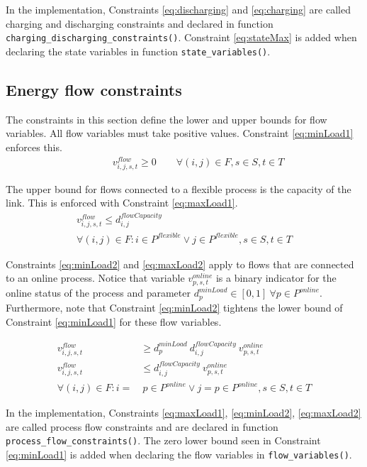 \documentclass{article}
\begin{document}
In the implementation, Constraints \eqref{eq:discharging} and \eqref{eq:charging} are called charging and discharging constraints and declared in function \texttt{charging\_discharging\_constraints()}. Constraint \eqref{eq:stateMax} is added when declaring the state variables in function \texttt{state\_variables()}.


\subsection{Energy flow constraints}

The constraints in this section define the lower and upper bounds for flow variables. All flow variables must take positive values. Constraint \eqref{eq:minLoad1} enforces this.
\begin{align}
    & \quad \quad v^{flow}_{i,j,s,t} \geq 0 \quad \quad \forall (i,j) \in F, s \in S, t \in T \label{eq:minLoad1} 
\end{align}

The upper bound for flows connected to a flexible process is the capacity of the link. This is enforced with Constraint \eqref{eq:maxLoad1}. %
\begin{gather}
    v^{flow}_{i,j,s,t} \leq d^{flowCapacity}_{i,j} \label{eq:maxLoad1}  \\[0.5cm]
    \forall (i,j) \in F: i \in P^{flexible} \lor j \in P^{flexible}, s \in S, t \in T  \nonumber
\end{gather}


 Constraints \eqref{eq:minLoad2} and \eqref{eq:maxLoad2} apply to flows that are connected to an online process. Notice that variable $v^{online}_{p,s,t}$ is a binary indicator for the online status of the process and parameter $d^{minLoad}_{p} \in [0,1] \ \forall p \in P^{online}$. Furthermore, note that Constraint \eqref{eq:minLoad2} tightens the lower bound of Constraint \eqref{eq:minLoad1} for these flow variables.

\begin{align}
     v^{flow}_{i,j,s,t} &\geq d^{minLoad}_{p} \ d^{flowCapacity}_{i,j} \ v^{online}_{p,s,t} \label{eq:minLoad2} \\[0.5cm]
    v^{flow}_{i,j,s,t} &\leq d^{flowCapacity}_{i,j} \  v^{online}_{p,s,t}  \label{eq:maxLoad2} \\[0.5cm]
    \forall (i,j) \in F: i = & \ p\in P^{online} \lor j=p \in P^{online}, s \in S, t \in T  \nonumber 
\end{align} 

 In the implementation, Constraints \eqref{eq:maxLoad1}, \eqref{eq:minLoad2}, \eqref{eq:maxLoad2} are called process flow constraints and are declared in function \texttt{process\_flow\_constraints()}. The zero lower bound seen in Constraint \eqref{eq:minLoad1} is added when declaring the flow variables in \texttt{flow\_variables()}.
\end{document}
